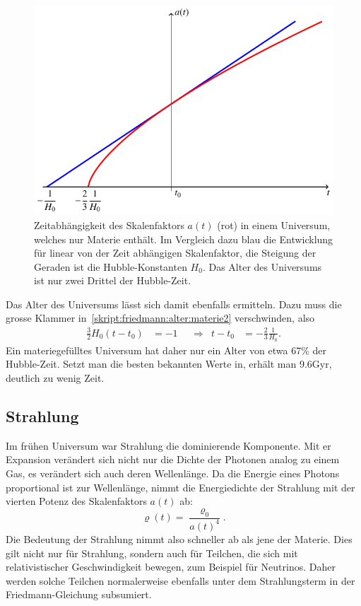 \begin{figure}
\centering
\includegraphics{chapters/tikz/friedmann-materie.pdf}
\caption{Zeitabhängigkeit des Skalenfaktors $a(t)$ ({\color{red}rot})
in einem Universum, welches nur Materie enthält.
Im Vergleich dazu {\color{blue}blau} die Entwicklung für linear von der
Zeit abhängigen Skalenfaktor, die Steigung der Geraden ist die
Hubble-Konstanten $H_0$.
Das Alter des Universums ist nur zwei Drittel der Hubble-Zeit.
\label{skript:friedmann:graph:materie}}
\end{figure}

Das Alter des Universums lässt sich damit ebenfalls ermitteln.
Dazu muss die grosse Klammer in~\eqref{skript:friedmann:alter:materie2}
verschwinden, also
\begin{equation}
\begin{aligned}
\frac32H_0(t-t_0)
&=
-1
&&\Rightarrow&
t-t_0
&=
-\frac23 \frac1{H_0}.
\end{aligned}
\label{skript:friedman:23h0}
\end{equation}
Ein materiegefülltes Universum hat daher nur ein Alter von
etwa 67\% der Hubble-Zeit. 
Setzt man die besten bekannten Werte in, erhält man 9.6Gyr,
deutlich zu wenig Zeit.

\subsection{Strahlung}
Im frühen Universum war Strahlung die dominierende Komponente.
Mit er Expansion verändert sich nicht nur die Dichte der Photonen 
analog zu einem Gas, es verändert sich auch deren Wellenlänge.
Da die Energie eines Photons proportional ist zur Wellenlänge,
nimmt die Energiedichte der Strahlung mit der vierten Potenz des
Skalenfaktors $a(t)$ ab:
\[
\varrho(t)=\frac{\varrho_0}{a(t)^4}.
\]
Die Bedeutung der Strahlung nimmt also schneller ab als jene der Materie.
Dies gilt nicht nur für Strahlung, sondern auch für Teilchen, die
sich mit relativistischer Geschwindigkeit bewegen, zum Beispiel für
Neutrinos.
Daher werden solche Teilchen normalerweise ebenfalls unter dem
Strahlungsterm in der Friedmann-Gleichung subsumiert.

